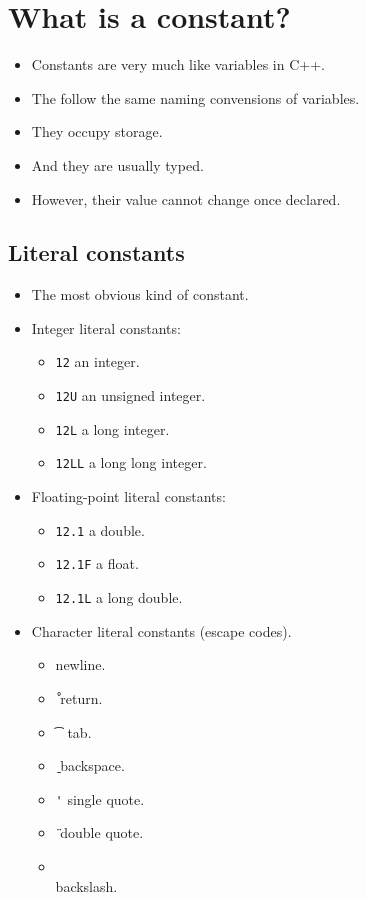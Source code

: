 \section{What is a constant?}
\begin{itemize}
    \item Constants are very much like variables in C++. 
    \item The follow the same naming convensions of variables.
    \item They occupy storage.
    \item And they are usually typed. 
    \item However, their value cannot change once declared. 
\end{itemize}

\subsection{Literal constants}
\begin{itemize}
    \item The most obvious kind of constant. 
    \item Integer literal constants:
        \begin{itemize}
            \item \texttt{12} an integer.
            \item \texttt{12U} an unsigned integer.
            \item \texttt{12L} a long integer.
            \item \texttt{12LL} a long long integer.
        \end{itemize}
    \item Floating-point literal constants:
        \begin{itemize}
            \item \texttt{12.1} a double.
            \item \texttt{12.1F} a float.
            \item \texttt{12.1L} a long double.
        \end{itemize}
    \item Character literal constants (escape codes).
        \begin{itemize}
            \item \texttt{\n} newline.
            \item \texttt{\r} return.
            \item \texttt{\t} tab.
            \item \texttt{\b} backspace. 
            \item \texttt{\'} single quote.
            \item \texttt{\"} double quote.
            \item \texttt{\\} backslash.
        \end{itemize}
\end{itemize}

